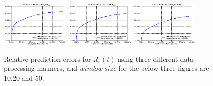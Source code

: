 \documentclass[sigconf]{acmart}
\begin{document}
	\begin{figure} 	
		\includegraphics[width=0.3\textwidth]{fig4/data-3-task-1-7030-windowsize10-RF.pdf} 
		\includegraphics[width=0.3\textwidth]{fig4/data-3-task-1-7030-windowsize20-RF.pdf}
		\includegraphics[width=0.3\textwidth]{fig4/data-3-task-1-7030-windowsize50-RF.pdf}
		\caption{Relative prediction errors for $R_r(t)$ using three different data processing manners, and $window\ size$ for the below three figures are 10,20 and 50.}
		\label{fig:task1_RF}  
	\end{figure}
	
\end{document}
